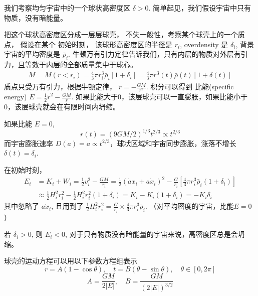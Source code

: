\documentclass[12pt]{ctexart}
\begin{document}
我们考察均匀宇宙中的一个球状高密度区 $\delta>0$. 简单起见，我们假设宇宙中只有物质，没有暗能量。

把这个球状高密度区分成一层层球壳，
不失一般性，考察某个球壳上的一个质点，
假设在某个 初始时刻， 该球形高密度区的半径是 $r_i$, overdensity 是 $\delta_i$, 背景宇宙的平均密度是 $\bar{\rho}_i$.
牛顿万有引力定律告诉我们，只有内层的物质对外层有引力，且等效于内层的全部质量集中于球心。
\begin{eqnarray}
    M=M(r<r_i)=\frac{4}{3} \pi r_{i}^{3} \bar{\rho}_{i}\left[1+\delta_{i}\right]=\frac{4}{3} \pi r^{3}(t) \bar{\rho}(t)[1+\delta(t)]
\end{eqnarray}
质点只受万有引力，根据牛顿定律， $\ddot{r}=-\frac{GM}{r^2}$. 
积分可以得到 比能(specific energy) $E=\frac{1}{2} \dot{r}^{2}-\frac{G M}{r}$. 如果比能大于0，该层球壳可以一直膨胀，如果比能小于0，该层球壳就会在有限时间内坍缩。

如果比能 $E=0$, 
\begin{equation}
    r(t)=(9 G M / 2)^{1 / 3} t^{2 / 3} \propto t^{2 / 3}
\end{equation}
而宇宙膨胀速率 $D(a) = a\propto t^{2 / 3}$，球状区域和宇宙同步膨胀，涨落不增长 $\delta(t) = \delta_i$.

在初始时刻，
\begin{equation}
    \begin{aligned}
        E_{i} &=K_{i}+W_{i}=\frac{1}{2} v_{i}^{2}-\frac{G M}{r_{i}}=\frac{1}{2}\left(\dot{a} x_{i}+a \dot{x}_{i}\right)^{2}-\frac{G}{r_{i}}\left[\frac{4}{3} \pi r_{i}^{3} \bar{\rho}_{i}\left(1+\delta_{i}\right)\right] \\
        & \approx \frac{1}{2} H_{i}^{2} r_{i}^{2}-\frac{1}{2} H_{i}^{2} r_{i}^{2}\left(1+\delta_{i}\right)=K_{i}-K_{i}\left(1+\delta_{i}\right)=-K_{i} \delta_{i}
    \end{aligned}
\end{equation}
其中忽略了  $a \dot{x}_{i}$, 且用到了 
$\frac{1}{2} H_{i}^{2} r_{i}^{2} = \frac{G}{r_i} \times \frac{4}{3} \pi r_{i}^{3} \bar{\rho}_{i}$.
（对平均密度的宇宙，比能$E=0$）

若 $\delta_i>0$, 则 $E_i<0$, 对于只有物质没有暗能量的宇宙来说，高密度区总是会坍缩。

球壳的运动方程可以用以下参数方程组表示
\begin{equation} \label{eq:EoM}
    r=A(1-\cos \theta), \quad 
    t=B(\theta-\sin \theta), \quad
    \theta \in[0,2 \pi]
\end{equation}
\begin{equation}
    A=\frac{G M}{2|E|}, \quad
    B=\frac{G M}{(2|E|)^{3 / 2}}
\end{equation}
\end{document}

